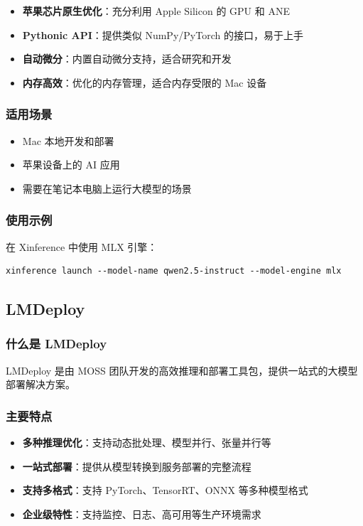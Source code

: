 \documentclass[12pt,UTF8]{ctexbook}
\begin{document}
\begin{itemize}[leftmargin=2cm]
    \item \textbf{苹果芯片原生优化}：充分利用 Apple Silicon 的 GPU 和 ANE
    \item \textbf{Pythonic API}：提供类似 NumPy/PyTorch 的接口，易于上手
    \item \textbf{自动微分}：内置自动微分支持，适合研究和开发
    \item \textbf{内存高效}：优化的内存管理，适合内存受限的 Mac 设备
\end{itemize}

\subsubsection{适用场景}

\begin{itemize}[leftmargin=2cm]
    \item Mac 本地开发和部署
    \item 苹果设备上的 AI 应用
    \item 需要在笔记本电脑上运行大模型的场景
\end{itemize}

\subsubsection{使用示例}

在 Xinference 中使用 MLX 引擎：

\begin{lstlisting}
xinference launch --model-name qwen2.5-instruct --model-engine mlx
\end{lstlisting}

\subsection{LMDeploy}
\label{subsec:lmdeploy}

\subsubsection{什么是 LMDeploy}

LMDeploy 是由 MOSS 团队开发的高效推理和部署工具包，提供一站式的大模型部署解决方案。

\subsubsection{主要特点}

\begin{itemize}[leftmargin=2cm]
    \item \textbf{多种推理优化}：支持动态批处理、模型并行、张量并行等
    \item \textbf{一站式部署}：提供从模型转换到服务部署的完整流程
    \item \textbf{支持多格式}：支持 PyTorch、TensorRT、ONNX 等多种模型格式
    \item \textbf{企业级特性}：支持监控、日志、高可用等生产环境需求
\end{itemize}
\end{document}
